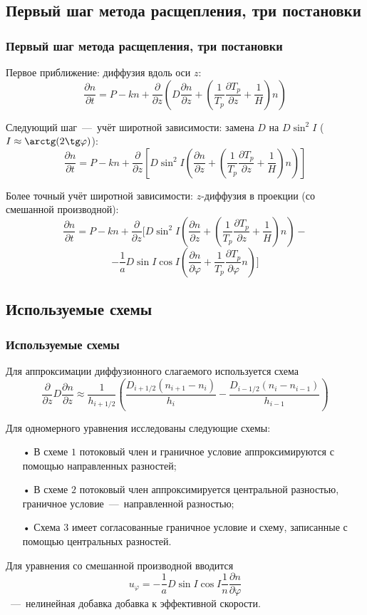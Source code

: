 \documentclass[9pt, apectratio=43,unicode]{beamer}
\begin{document}
\subsection{Первый шаг метода расщепления, три постановки}
\begin{frame}\frametitle{Первый шаг метода расщепления, три постановки}

Первое приближение: диффузия вдоль оси $z$:
$$\dfrac{\partial n}{\partial t} = P-kn+\dfrac{\partial}{\partial z}\left(D\dfrac{\partial n}{\partial z} + \left(\dfrac{1}{T_p}\dfrac{\partial T_p}{\partial z}+\dfrac{1}{H}\right) n\right)$$

Следующий шаг~---~учёт широтной зависимости: замена $D$ на $D\sin^2I$ ($I \approx \arctg(2\tg \varphi)$):
$$\dfrac{\partial n}{\partial t} =P-kn+\dfrac{\partial}{\partial z}\left[D\sin^2I\left(\dfrac{\partial n}{\partial z} + \left(\dfrac{1}{T_p}\dfrac{\partial T_p}{\partial z}+\dfrac{1}{H}\right) n\right)\right]$$

Более точный учёт широтной зависимости: $z$-диффузия в проекции (со смешанной производной):
$$\dfrac{\partial n}{\partial t} =P-kn+\dfrac{\partial}{\partial z}\biggl[D\sin^2 I\left(\dfrac{\partial n}{\partial z}+\left(\dfrac{1}{T_p}\dfrac{\partial T_p}{\partial z}+\dfrac{1}{H}\right)n\right)-$$ $$-\dfrac{1}{a}D\sin I\cos I\left(\dfrac{\partial n}{\partial\varphi}+\dfrac{1}{T_p}\dfrac{\partial T_p}{\partial\varphi}n\right)\biggr]$$ 
\end{frame}


\subsection{Используемые схемы}
\begin{frame}\frametitle{Используемые схемы}
Для аппроксимации диффузионного слагаемого используется схема $$\dfrac{\partial}{\partial z}D\dfrac{\partial n}{\partial z} \approx \dfrac{1}{h_{i+1/2}}\left(\dfrac{D_{i+1/2}(n_{i+1}-n_i)}{h_i}-\dfrac{D_{i-1/2}(n_{i}-n_{i-1})}{h_{i-1}}\right)$$

Для одномерного уравнения исследованы следующие схемы:

\begin{itemize}
\item[•] В схеме $1$ потоковый член и граничное условие аппроксимируются с помощью направленных разностей; 
\item[•] В схеме $2$ потоковый член аппроксимируется центральной разностью, граничное условие~---~направленной разностью;
\item[•] Схема $3$ имеет согласованные граничное условие и схему, записанные с помощью центральных разностей.
\end{itemize}

Для уравнения со смешанной производной вводится $$u_\varphi=-\dfrac{1}{a}D\sin I \cos I\dfrac{1}{n}\dfrac{\partial n}{\partial \varphi}$$~---~нелинейная добавка добавка к эффективной скорости.
\end{frame}
\end{document}
